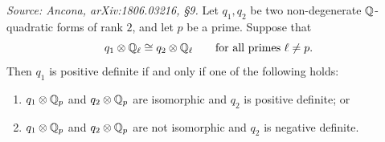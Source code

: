 \begin{corollary}
  \label{cor:signature-top}
  \textit{Source: Ancona, arXiv:1806.03216, §9.}
  Let \(q_1, q_2\) be two non-degenerate \(\mathbb{Q}\)-quadratic forms of rank \(2\),
  and let \(p\) be a prime. Suppose that
  \[q_1 \otimes \mathbb{Q}_\ell \cong q_2 \otimes \mathbb{Q}_\ell \qquad
    \text{for all primes } \ell \neq p.\]
  Then \(q_1\) is positive definite if and only if one of the following holds:
  \begin{enumerate}
    \item \(q_1 \otimes \mathbb{Q}_p\) and \(q_2 \otimes \mathbb{Q}_p\) are isomorphic and
      \(q_2\) is positive definite; or
    \item \(q_1 \otimes \mathbb{Q}_p\) and \(q_2 \otimes \mathbb{Q}_p\) are not isomorphic and
      \(q_2\) is negative definite.
  \end{enumerate}
\end{corollary}

